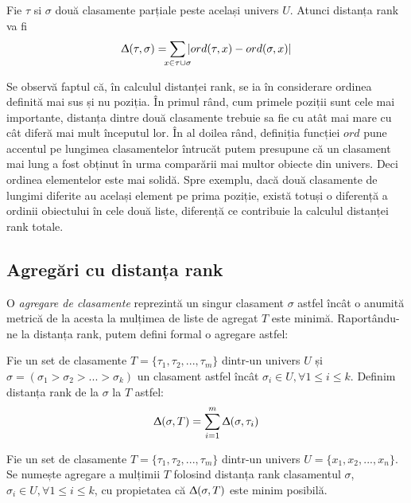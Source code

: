 \begin{definition}
Fie $\tau$ si $\sigma$ două clasamente parțiale peste același univers $U$. Atunci distanța rank va fi
\[
  \Updelta(\tau, \sigma) = \smashoperator{\sum_{x \in \tau \cup \sigma}} |ord(\tau, x) - ord(\sigma, x)|
\]
\end{definition}

Se observă faptul că, în calculul distanței rank, se ia în considerare ordinea definită mai sus
și nu poziția. În primul rând, cum primele poziții sunt cele mai importante, distanța dintre două
clasamente trebuie sa fie cu atât mai mare cu cât diferă mai mult începutul lor\cite{linguisticstructuresmarcus}.
În al doilea rând, definiția funcției $ord$ pune accentul pe lungimea clasamentelor întrucăt putem
presupune că un clasament mai lung a fost obținut în urma comparării mai multor obiecte din univers.
Deci ordinea elementelor este mai solidă. Spre exemplu, dacă două clasamente de lungimi diferite au
același element pe prima poziție, există totuși o diferență a ordinii obiectului în cele două liste,
diferență ce contribuie la calculul distanței rank totale.\cite{rankaggregationproblem}

\subsection{Agregări cu distanța rank}
O \textit{agregare de clasamente} reprezintă un singur clasament $\sigma$ astfel încât o anumită 
metrică de la acesta la mulțimea de liste de agregat $T$ este minimă. Raportându-ne la distanța rank,
putem defini formal o agregare astfel:

\begin{definition}
Fie un set de clasamente $T = \{\tau_1, \tau_2, ..., \tau_m\}$ dintr-un univers $U$ și
$\sigma = (\sigma_1 > \sigma_2 > ... > \sigma_k)$ un clasament astfel încât $\sigma_i \in U, 
\forall 1 \leqslant i \leqslant k$. Definim distanța rank de la $\sigma$ la $T$ astfel:
\[
  \Updelta(\sigma, T) = \smashoperator{\sum_{i = 1}^{m}} \Updelta(\sigma, \tau_i)
\]
\end{definition}

\begin{definition}
Fie un set de clasamente $T = \{\tau_1, \tau_2, ..., \tau_m\}$ dintr-un univers 
$U = \{x_1, x_2, ..., x_n \}$. Se numește agregare a mulțimii $T$ folosind distanța rank clasamentul
$\sigma$, $\sigma_i \in U, \forall 1 \leqslant i \leqslant k$, cu propietatea că 
$\Updelta(\sigma, T)$ este minim posibilă.
\end{definition}

